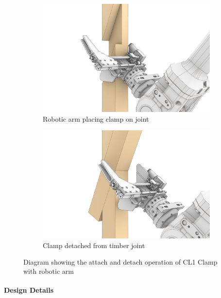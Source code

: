 \begin{figure}
    \centering
    \begin{subfigure}[b]{0.49\textwidth}
        \centering
        \includegraphics[width=\textwidth]{images/05/image51.jpg}
        \caption{Robotic arm placing clamp on joint}
        \label{fig:cl3-robot-detach-1}
    \end{subfigure}
    \hfill
    \begin{subfigure}[b]{0.49\textwidth}
        \centering
        \includegraphics[width=\textwidth]{images/05/image21.jpg}
        \caption{Clamp detached from timber joint}
        \label{fig:cl3-robot-detach-2}
    \end{subfigure}
    \caption{Diagram showing the attach and detach operation of CL1 Clamp with robotic arm}
    \label{fig:cl3-robot-detach}
\end{figure}


\paragraph{Design Details}

